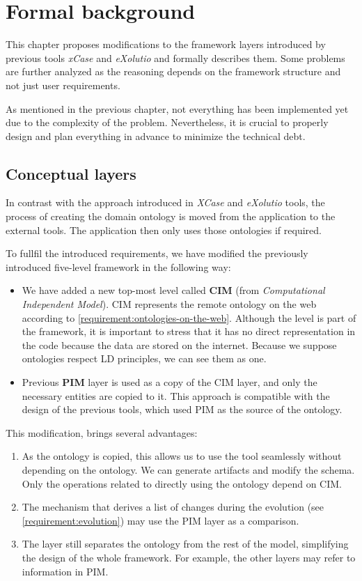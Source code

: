 \chapter{Formal background}
\label{chapters:formal-background}

This chapter proposes modifications to the framework layers introduced by previous tools \textit{xCase} and \textit{eXolutio} and formally describes them. Some problems are further analyzed as the reasoning depends on the framework structure and not just user requirements.

As mentioned in the previous chapter, not everything has been implemented yet due to the complexity of the problem. Nevertheless, it is crucial to properly design and plan everything in advance to minimize the technical debt.

\section{Conceptual layers}

In contrast with the approach introduced in \textit{XCase} and \textit{eXolutio} tools, the process of creating the domain ontology is moved from the application to the external tools. The application then only uses those ontologies if required.

To fullfil the introduced requirements, we have modified the previously introduced five-level framework in the following way:
\begin{itemize}
    \item We have added a new top-most level called \textbf{CIM} (from \textit{Computational Independent Model}). CIM represents the remote ontology on the web according to \autoref{requirement:ontologies-on-the-web}. Although the level is part of the framework, it is important to stress that it has no direct representation in the code because the data are stored on the internet. Because we suppose ontologies respect LD principles, we can see them as one.
    \item Previous \textbf{PIM} layer is used as a copy of the CIM layer, and only the necessary entities are copied to it. This approach is compatible with the design of the previous tools, which used PIM as the source of the ontology.
\end{itemize}

This modification, brings several advantages:
\begin{enumerate}
    \item As the ontology is copied, this allows us to use the tool seamlessly without depending on the ontology. We can generate artifacts and modify the schema. Only the operations related to directly using the ontology depend on CIM.
    \item The mechanism that derives a list of changes during the evolution (see \autoref{requirement:evolution}) may use the PIM layer as a comparison.
    \item The layer still separates the ontology from the rest of the model, simplifying the design of the whole framework. For example, the other layers may refer to information in PIM.
\end{enumerate}

